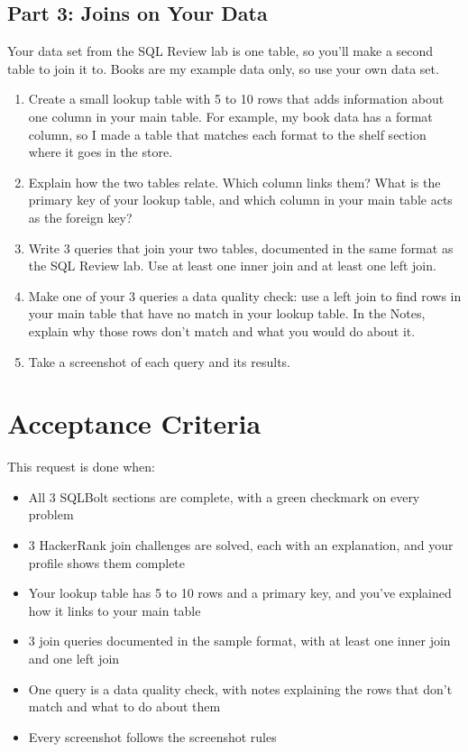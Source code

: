 \documentclass[12pt]{article}
\begin{document}
\subsection*{Part 3: Joins on Your Data}
Your data set from the SQL Review lab is one table, so you'll make a second table to join it to. Books are my example data only, so use your own data set.
\begin{enumerate}
    \item Create a small lookup table with 5 to 10 rows that adds information about one column in your main table. For example, my book data has a format column, so I made a table that matches each format to the shelf section where it goes in the store.
    \item Explain how the two tables relate. Which column links them? What is the primary key of your lookup table, and which column in your main table acts as the foreign key?
    \item Write 3 queries that join your two tables, documented in the same format as the SQL Review lab. Use at least one inner join and at least one left join.
    \item Make one of your 3 queries a data quality check: use a left join to find rows in your main table that have no match in your lookup table. In the Notes, explain why those rows don't match and what you would do about it.
    \item Take a screenshot of each query and its results.
\end{enumerate}

\section*{Acceptance Criteria}
This request is done when:
\begin{itemize}
    \item All 3 SQLBolt sections are complete, with a green checkmark on every problem
    \item 3 HackerRank join challenges are solved, each with an explanation, and your profile shows them complete
    \item Your lookup table has 5 to 10 rows and a primary key, and you've explained how it links to your main table
    \item 3 join queries documented in the sample format, with at least one inner join and one left join
    \item One query is a data quality check, with notes explaining the rows that don't match and what to do about them
    \item Every screenshot follows the screenshot rules
\end{itemize}
\end{document}
